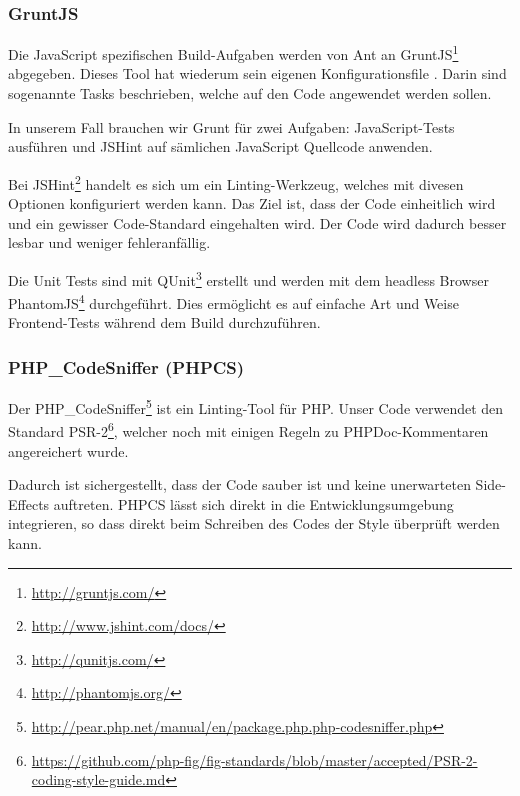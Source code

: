 \subsubsection{GruntJS}
\label{gruntjs}
Die JavaScript spezifischen Build-Aufgaben werden von Ant an GruntJS\footnote{\url{http://gruntjs.com/}} abgegeben.
Dieses Tool hat wiederum sein eigenen Konfigurationsfile .
Darin sind sogenannte Tasks beschrieben, welche auf den Code angewendet werden sollen.

In unserem Fall brauchen wir Grunt für zwei Aufgaben: JavaScript-Tests ausführen und JSHint auf sämlichen JavaScript Quellcode anwenden.

Bei JSHint\footnote{\url{http://www.jshint.com/docs/}} handelt es sich um ein Linting-Werkzeug, welches mit divesen Optionen konfiguriert werden kann.
Das Ziel ist, dass der Code einheitlich wird und ein gewisser Code-Standard eingehalten wird.
Der Code wird dadurch besser lesbar und weniger fehleranfällig.

Die Unit Tests sind mit QUnit\footnote{\url{http://qunitjs.com/}} erstellt und werden mit dem headless Browser PhantomJS\footnote{\url{http://phantomjs.org/}} durchgeführt.
Dies ermöglicht es auf einfache Art und Weise Frontend-Tests während dem Build durchzuführen.

\subsubsection{PHP\_CodeSniffer (PHPCS)}
\label{phpcs}
Der PHP\_CodeSniffer\footnote{\url{http://pear.php.net/manual/en/package.php.php-codesniffer.php}} ist ein Linting-Tool für PHP.
Unser Code verwendet den Standard PSR-2\footnote{\url{https://github.com/php-fig/fig-standards/blob/master/accepted/PSR-2-coding-style-guide.md}}, welcher noch mit einigen Regeln zu PHPDoc-Kommentaren angereichert wurde.

Dadurch ist sichergestellt, dass der Code sauber ist und keine unerwarteten Side-Effects auftreten.
PHPCS lässt sich direkt in die Entwicklungsumgebung integrieren, so dass direkt beim Schreiben des Codes der Style überprüft werden kann.
